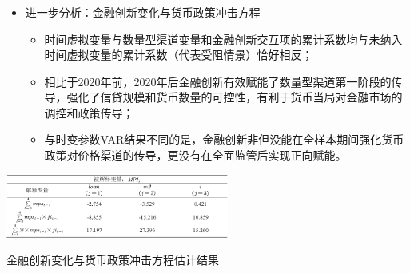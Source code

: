 \documentclass[12pt,aspectratio=169]{ctexbeamer}
\begin{document}
			\begin{frame}
				\frametitle{}
				\vspace{5mm}
				\begin{itemize}
					\item 进一步分析：金融创新变化与货币政策冲击方程
					\begin{itemize}
						\justifying
						\footnotesize
						\item 时间虚拟变量与数量型渠道变量和金融创新交互项的累计系数均与未纳入时间虚拟变量的累计系数（代表受阻情景）恰好相反；
						\item 相比于2020年前，2020年后金融创新有效赋能了数量型渠道第一阶段的传导，强化了信贷规模和货币数量的可控性，有利于货币当局对金融市场的调控和政策传导；
						\item 与时变参数VAR结果不同的是，金融创新非但没能在全样本期间强化货币政策对价格渠道的传导，更没有在全面监管后实现正向赋能。
					\end{itemize}
				\end{itemize}
				\vspace{2mm}
				\begin{table}
					\centering
					\includegraphics[width=0.55\textwidth]{figures/tab.6-3}
					\caption{金融创新变化与货币政策冲击方程估计结果}
					\label{tab.6-3}
				\end{table}
			\end{frame}
\end{document}
